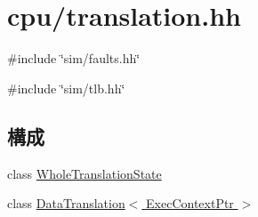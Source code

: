 \hypertarget{translation_8hh}{
\section{cpu/translation.hh}
\label{translation_8hh}
}
{\ttfamily \#include \char`\"{}sim/faults.hh\char`\"{}}\par
{\ttfamily \#include \char`\"{}sim/tlb.hh\char`\"{}}\par
\subsection*{構成}
\begin{DoxyCompactItemize}
\item 
class \hyperlink{classWholeTranslationState}{WholeTranslationState}
\item 
class \hyperlink{classDataTranslation}{DataTranslation$<$ ExecContextPtr $>$}
\end{DoxyCompactItemize}
